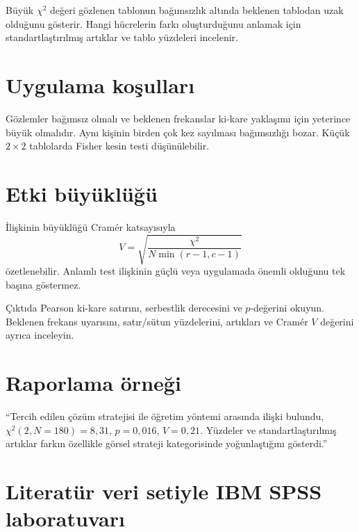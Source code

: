 Büyük $\chi^2$ değeri gözlenen tablonun bağımsızlık altında beklenen tablodan
uzak olduğunu gösterir. Hangi hücrelerin farkı oluşturduğunu anlamak için
standartlaştırılmış artıklar ve tablo yüzdeleri incelenir.

\section{Uygulama koşulları}

Gözlemler bağımsız olmalı ve beklenen frekanslar ki-kare yaklaşımı için
yeterince büyük olmalıdır. Aynı kişinin birden çok kez sayılması bağımsızlığı
bozar. Küçük $2\times2$ tablolarda Fisher kesin testi düşünülebilir.

\section{Etki büyüklüğü}

İlişkinin büyüklüğü Cramér katsayısıyla
\[
V=\sqrt{\frac{\chi^2}{N\min(r-1,c-1)}}
\]
özetlenebilir. Anlamlı test ilişkinin güçlü veya uygulamada önemli olduğunu
tek başına göstermez.

\begin{outputguidebox}
Çıktıda Pearson ki-kare satırını, serbestlik derecesini ve $p$-değerini
okuyun. Beklenen frekans uyarısını, satır/sütun yüzdelerini, artıkları ve
Cramér $V$ değerini ayrıca inceleyin.
\end{outputguidebox}

\section{Raporlama örneği}

``Tercih edilen çözüm stratejisi ile öğretim yöntemi arasında ilişki bulundu,
$\chi^2(2,N=180)=8{,}31$, $p=0{,}016$, $V=0{,}21$. Yüzdeler ve
standartlaştırılmış artıklar farkın özellikle görsel strateji kategorisinde
yoğunlaştığını gösterdi.''

\section{Literatür veri setiyle IBM SPSS laboratuvarı}

